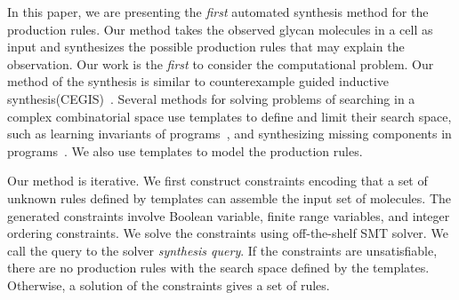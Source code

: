 In this paper, we are presenting the {\em first} automated synthesis
method for the production rules.
Our method takes the observed glycan molecules in a cell as input and synthesizes
the possible production rules that may explain the observation.
Our work is the {\em first} to consider the computational problem.
Our method of the synthesis is similar to counterexample guided
inductive synthesis(CEGIS)~\cite{cegis}.
Several methods for solving problems of searching in a complex combinatorial
space use templates to define and limit their search space,
such as learning invariants of programs~\cite{InvGenTACAS09},
and synthesizing missing components in programs~\cite{sygus,Solar-Lezama2005}.
We also use templates to model the production rules.


Our method is iterative.
We first construct constraints encoding that a set of unknown rules
defined by templates can assemble the input set of molecules.
The generated constraints involve Boolean variable, finite range variables, and integer ordering
constraints.
We solve the constraints using off-the-shelf SMT solver.
We call the query to the solver {\em synthesis query}.
If the constraints are unsatisfiable, there are no production rules with the search space
defined by the templates.
Otherwise, a solution of the constraints gives a set of rules.


